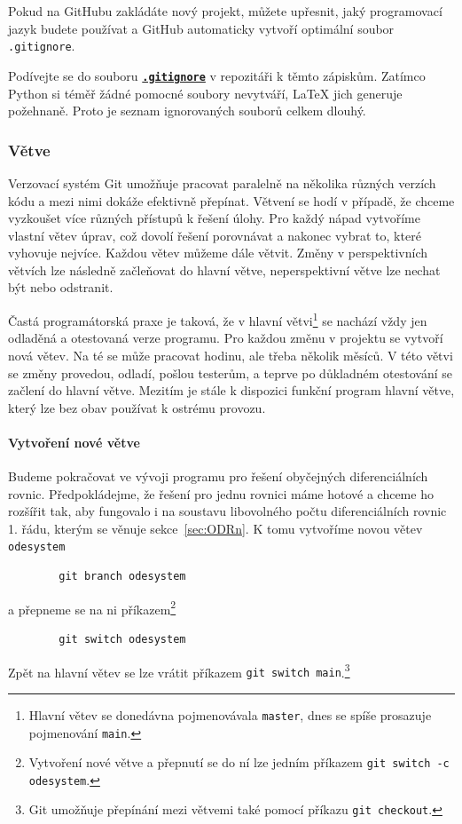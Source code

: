 \documentclass[a4paper,11pt,twoside]{article}
\newcommand{\subsubsubsection}[1]{\paragraph{#1}\mbox{}

}
\def\code#1{\textnormal{\texttt{#1}}}
\def\ghfile#1#2{\textnormal{\textbf{\texttt{\href{https://github.com/PavelStransky/PCInPhysics/blob/main/#1#2}{#2}}}}}
\theoremstyle{red}
\theoremstyle{green}
\begin{document}
    Pokud na GitHubu zakládáte nový projekt, můžete upřesnit, jaký programovací jazyk budete používat a GitHub automaticky vytvoří optimální soubor \code{.gitignore}.

    \begin{voluntary}
        Podívejte se do souboru \ghfile{}{.gitignore} v repozitáři k těmto zápiskům.
        Zatímco Python si téměř žádné pomocné soubory nevytváří, {\LaTeX} jich generuje požehnaně.
        Proto je seznam ignorovaných souborů celkem dlouhý. 
    \end{voluntary}

\subsubsection{Větve}
\label{sec:branches}
    Verzovací systém Git umožňuje pracovat paralelně na několika různých verzích kódu a mezi nimi dokáže efektivně přepínat.
    Větvení se hodí v případě, že chceme vyzkoušet více různých přístupů k řešení úlohy.
    Pro každý nápad vytvoříme vlastní větev úprav, což dovolí řešení porovnávat a nakonec vybrat to, které vyhovuje nejvíce.
    Každou větev můžeme dále větvit.
    Změny v perspektivních větvích lze následně začleňovat do hlavní větve, neperspektivní větve lze nechat být nebo odstranit.
    
    Častá programátorská praxe je taková, že v hlavní větvi\footnote{Hlavní větev se donedávna pojmenovávala \code{master}, dnes se spíše prosazuje pojmenování \code{main}.} se nachází vždy jen odladěná a otestovaná verze programu.
    Pro každou změnu v projektu se vytvoří nová větev.
    Na té se může pracovat hodinu, ale třeba několik měsíců.
    V této  větvi se změny provedou, odladí, pošlou testerům, a teprve po důkladném otestování se začlení do hlavní větve.
    Mezitím je stále k dispozici funkční program hlavní větve, který lze bez obav používat k ostrému provozu.

\subsubsubsection{Vytvoření nové větve}
    Budeme pokračovat ve vývoji programu pro řešení obyčejných diferenciálních rovnic.
    Předpokládejme, že řešení pro jednu rovnici máme hotové a chceme ho rozšířit tak, aby fungovalo i na soustavu libovolného počtu diferenciálních rovnic 1. řádu, kterým se věnuje sekce~\ref{sec:ODRn}.
    K tomu vytvoříme novou větev \code{odesystem}
    \begin{lstlisting}
        git branch odesystem\end{lstlisting}
    a přepneme se na ni příkazem\footnote{
        Vytvoření nové větve a přepnutí se do ní lze jedním příkazem \code{git switch -c odesystem}.
    }
    \begin{lstlisting}
        git switch odesystem\end{lstlisting}
        Zpět na hlavní větev se lze vrátit příkazem \code{git switch main}.\footnote{
            Git umožňuje přepínání mezi větvemi také pomocí příkazu \code{git checkout}.
        }
\end{document}
